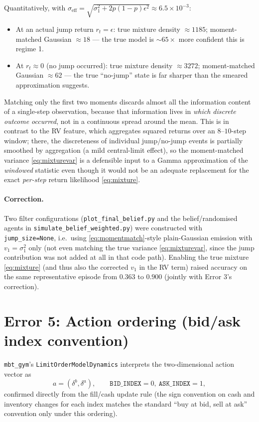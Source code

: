 \documentclass[11pt]{article}
\begin{document}
Quantitatively, with $\sigma_{\text{eff}} = \sqrt{\sigma_1^2 + 2p(1-p)\epsilon^2} \approx 6.5\times 10^{-3}$:
\begin{itemize}
\item At an actual jump return $r_t = \epsilon$: true mixture density $\approx 1185$; moment-matched Gaussian $\approx 18$ — the true model is $\sim 65\times$ more confident this is regime 1.
\item At $r_t \approx 0$ (no jump occurred): true mixture density $\approx 3272$; moment-matched Gaussian $\approx 62$ — the true ``no-jump'' state is far sharper than the smeared approximation suggests.
\end{itemize}
Matching only the first two moments discards almost all the information content of a single-step observation, because that information lives in \emph{which discrete outcome occurred}, not in a continuous spread around the mean. This is in contrast to the RV feature, which aggregates squared returns over an $8$--$10$-step window; there, the discreteness of individual jump/no-jump events is partially smoothed by aggregation (a mild central-limit effect), so the moment-matched variance \eqref{eq:mixturevar} is a defensible input to a Gamma approximation of the \emph{windowed} statistic even though it would not be an adequate replacement for the exact \emph{per-step} return likelihood \eqref{eq:mixture}.

\paragraph{Correction.} Two filter configurations (\texttt{plot\_final\_belief.py} and the belief/randomised agents in \texttt{simulate\_belief\_weighted.py}) were constructed with \texttt{jump\_size=None}, i.e.\ using \eqref{eq:momentmatch}-style plain-Gaussian emission with $v_1 = \sigma_1^2$ only (not even matching the true variance \eqref{eq:mixturevar}, since the jump contribution was not added at all in that code path). Enabling the true mixture \eqref{eq:mixture} (and thus also the corrected $v_1$ in the RV term) raised accuracy on the same representative episode from $0.363$ to $0.900$ (jointly with Error 3's correction).

\section{Error 5: Action ordering (bid/ask index convention)}
\label{sec:bidask}

\texttt{mbt\_gym}'s \texttt{LimitOrderModelDynamics} interprets the two-dimensional action vector as
\begin{equation}
a = (\delta^{b}, \delta^{a}), \qquad \texttt{BID\_INDEX}=0,\ \texttt{ASK\_INDEX}=1,
\end{equation}
confirmed directly from the fill/cash update rule (the sign convention on cash and inventory changes for each index matches the standard ``buy at bid, sell at ask'' convention only under this ordering).
\end{document}
